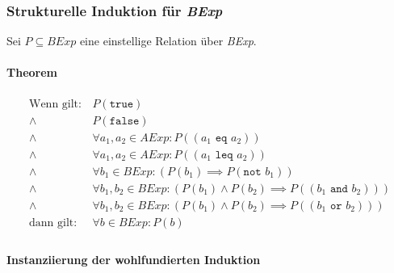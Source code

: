 			\subsubsection{Strukturelle Induktion für \textit{BExp}}
				Sei $ P \subseteq \textit{BExp} $ eine einstellige Relation über \textit{BExp}.

				\paragraph{Theorem}
					\begin{align*}
						\text{Wenn gilt:} & \,P(\texttt{true})                                                                                            \\
						\land             & \,P(\texttt{false})                                                                                           \\
						\land             & \,\forall a _ 1, a _ 2 \in \textit{AExp} : P((a _ 1 \texttt{ eq } a _ 2))                                     \\
						\land             & \,\forall a _ 1, a _ 2 \in \textit{AExp} : P((a _ 1 \texttt{ leq } a _ 2))                                    \\
						\land             & \,\forall b _ 1 \in \textit{BExp} : (P(b _ 1) \implies P(\texttt{not } b _ 1))                                \\
						\land             & \,\forall b _ 1, b _ 2 \in \textit{BExp} : (P(b _ 1) \land P(b _ 2) \implies P((b _ 1 \texttt{ and } b _ 2))) \\
						\land             & \,\forall b _ 1, b _ 2 \in \textit{BExp} : (P(b _ 1) \land P(b _ 2) \implies P((b _ 1 \texttt{ or } b _ 2)))  \\
						\text{dann gilt:} & \,\forall b \in \textit{BExp} : P(b)                                                                          \\
					\end{align*}

				\paragraph{Instanziierung der wohlfundierten Induktion}

